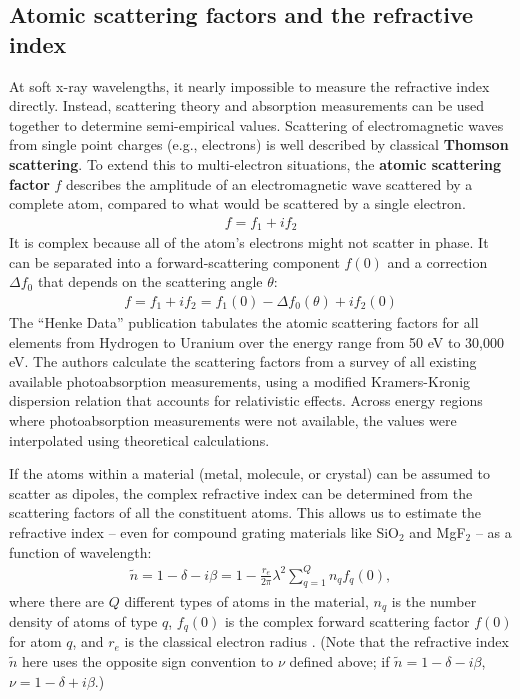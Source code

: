 \subsection{Atomic scattering factors and the refractive index}
\label{secHenke}
At soft x-ray wavelengths, it nearly impossible to measure the refractive index directly.  Instead, scattering theory and absorption measurements can be used together to determine semi-empirical values.  Scattering of electromagnetic waves from single point charges (e.g., electrons) is well described by classical \textbf{Thomson scattering}.  To extend this to multi-electron situations, the \textbf{atomic scattering factor} $f$ describes the amplitude of an electromagnetic wave scattered by a complete atom, compared to what would be scattered by a single electron.
\begin{align}
f = f_1 + i f_2
\end{align}
It is complex because all of the atom's electrons might not scatter in phase.  It can be separated into a forward-scattering component $f(0)$ and a correction $\Delta f_0$ that depends on the scattering angle $\theta$:
\begin{align}
f = f_1 + i f_2 = f_1(0) - \Delta f_0(\theta) + i f_2(0)
\end{align}
The ``Henke Data'' publication \cite{Hen93} tabulates the atomic scattering factors for all elements from Hydrogen to Uranium over the energy range from 50 eV to 30,000 eV.  The authors calculate the scattering factors from a survey of all existing available photoabsorption measurements, using a modified Kramers-Kronig dispersion relation that accounts for relativistic effects.  Across energy regions where photoabsorption measurements were not available, the values were interpolated using theoretical calculations.

If the atoms within a material (metal, molecule, or crystal) can be assumed to scatter as dipoles, the complex refractive index can be determined from the scattering factors of all the constituent atoms. This allows us to estimate the refractive index -- even for compound grating materials like SiO$_2$ and MgF$_2$ -- as a function of wavelength:
\begin{align}
\tilde n = 1 - \delta - i \beta = 1 - \frac{r_e}{2\pi} \lambda ^2 \sum\limits_{q=1}^Q n_q f_q(0),
\label{nFromScatteringFactor}
\end{align}
where there are $Q$ different types of atoms in the material, $n_q$ is the number density of atoms of type $q$, $f_q(0)$ is the complex forward scattering factor $f(0)$ for atom $q$, and $r_e$ is the classical electron radius \cite{Hen93}.    (Note that the refractive index $\tilde n$ here uses the opposite sign convention to $\nu$ defined above; if $\tilde n = 1 - \delta - i \beta$,  $\nu = 1 - \delta + i \beta$.)


